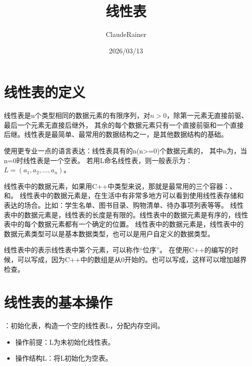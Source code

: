 \documentclass[b5paper,11pt]{article}
\title{线性表}
\date{2026/03/13}
\author{ClaudeRainer}
\begin{document}
\maketitle

\section{线性表的定义}
\begin{cquote}
  线性表是n个类型相同的数据元素的有限序列，对$n>0$，除第一元素无直接前驱、最后一个元素无直接后继外，
  其余的每个数据元素只有一个直接前驱和一个直接后继。线性表是最简单、最常用的数据结构之一，是其他数据结构的基础。
\end{cquote}
\begin{center}
\end{center}

使用更专业一点的语言表达：线性表具有{\color{ctp-rosewater}{相同数据类型}}的n(n>=0)个数据元素的{\color{ctp-rosewater}{有限序列}}，
其中n为{\color{ctp-red}{表长}}，当n=0时线性表是一个空表。
若用L命名线性表，则一般表示为：$L = (a_1, a_2, \dots, a_n)$。

线性表中的数据元素{\color{ctp-blue}{类型是相同的}}，如果用C++中类型来说，那就是最常用的三个容器：、和。
线性表中的数据元素是{\color{ctp-blue}{有序的}}，在生活中有非常多地方可以看到使用线性表存储和表达的场合。比如：学生名单、图书目录、购物清单、待办事项列表等等。
线性表中的数据元素是{\color{ctp-blue}{有限的}}，线性表的长度是有限的。线性表中的数据元素是有序的，线性表中的每个数据元素都有一个确定的位置。
线性表中的数据元素是{\color{ctp-blue}{相同类型的}}，线性表中的数据元素类型可以是基本数据类型，也可以是用户自定义的数据类型。

线性表中的{\color{ctp-red}{$a_i$}}表示线性表中第个元素，可以称作“位序”。
在使用C++的编写的时候，可以写成，因为C++中的数组是从0开始的。也可以写成，这样可以增加越界检查。

\section{线性表的基本操作}
：初始化表，构造一个空的线性表L，分配内存空间。
\begin{itemize}
  \item[] \hspace{1.5em}操作前提：L为未初始化线性表。
  \item[] \hspace{1.5em}操作结构L：将L初始化为空表。
\end{itemize}
\end{document}
